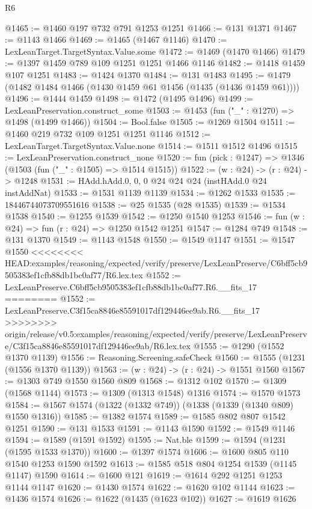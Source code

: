 \begin{lexlean}{R6}
\begin{coremodule}
{{{{{{{{{{{{{{{{{{{{{{{{{{{{{{{{{{{{{{{{{{{{{{{{{{{{{{{{{{{{{@1465 := @1460 @197 @732 @791 @1253 @1251
@1466 := @131 @1371
@1467 := @1143 @1466
@1469 := @1465 (@1467 @1146)
@1470 := LexLeanTarget.TargetSyntax.Value.some
@1472 := @1469 (@1470 @1466)
@1479 := @1397 @1459 @789 @109 @1251 @1251 @1466 @1146
@1482 := @1418 @1459 @107 @1251
@1483 := @1424 @1370
@1484 := @131 @1483
@1495 := @1479 (@1482 @1484 @1466 (@1430 @1459 @61 @1456 (@1435 (@1436 @1459 @61))))
@1496 := @1444 @1459
@1498 := @1472 (@1495 @1496)
@1499 := LexLeanPreservation.construct_some
@1503 := @1453 (fun ("_" : @1270) => @1498 (@1499 @1466))
@1504 := Bool.false
@1505 := @1269 @1504
@1511 := @1460 @219 @732 @109 @1251 @1251 @1146
@1512 := LexLeanTarget.TargetSyntax.Value.none
@1514 := @1511 @1512 @1496
@1515 := LexLeanPreservation.construct_none
@1520 := fun (pick : @1247) => @1346 (@1503 (fun ("_" : @1505) => @1514 @1515))
@1522 := (w : @24) -> (r : @24) -> @1248
@1531 := HAdd.hAdd.{0, 0, 0} @24 @24 @24 (instHAdd.{0} @24 instAddNat)
@1533 := @1531 @1139 @1139
@1534 := @1262 @1533
@1535 := 18446744073709551616
@1538 := @25 @1535 (@28 @1535)
@1539 := @1534 @1538
@1540 := @1255 @1539
@1542 := @1250 @1540 @1253
@1546 := fun (w : @24) => fun (r : @24) => @1250 @1542 @1251
@1547 := @1284 @749
@1548 := @131 @1370
@1549 := @1143 @1548
@1550 := @1549 @1147
@1551 := @1547 @1550
<<<<<<<< HEAD:examples/reasoning/expected/verify/preserve/LexLeanPreserve/C6bff5cb9505383ef1cfb88db1bc0af77/R6.lex.tex
@1552 := LexLeanPreserve.C6bff5cb9505383ef1cfb88db1bc0af77.R6.__fits_17
========
@1552 := LexLeanPreserve.C3f15ca8846e85591017df129446ee9ab.R6.__fits_17
>>>>>>>> origin/release/v0.5:examples/reasoning/expected/verify/preserve/LexLeanPreserve/C3f15ca8846e85591017df129446ee9ab/R6.lex.tex
@1555 := @1290 (@1552 @1370 @1139)
@1556 := Reasoning.Screening.safeCheck
@1560 := @1555 (@1231 (@1556 @1370 @1139))
@1563 := (w : @24) -> (r : @24) -> @1551 @1560
@1567 := @1303 @749 @1550 @1560 @809
@1568 := @1312 @102
@1570 := @1309 (@1568 @1144)
@1573 := @1309 (@1313 @1548) @1316
@1574 := @1570 @1573
@1584 := @1567 @1574 (@1322 (@1332 @749)) (@1338 (@1339 (@1340 @809) @1550 @1316))
@1585 := @1382 @1574
@1589 := @1585 @802 @807 @1542 @1251
@1590 := @131 @1533
@1591 := @1143 @1590
@1592 := @1549 @1146
@1594 := @1589 (@1591 @1592)
@1595 := Nat.ble
@1599 := @1594 (@1231 (@1595 @1533 @1370))
@1600 := @1397 @1574
@1606 := @1600 @805 @110 @1540 @1253 @1590 @1592
@1613 := @1585 @518 @804 @1254 @1539 (@1145 @1147) @1590
@1614 := @1600 @121
@1619 := @1614 @292 @1251 @1253 @1144 @1147
@1620 := @1430 @1574
@1622 := @1620 @102 @1144
@1623 := @1436 @1574
@1626 := @1622 (@1435 (@1623 @102))
@1627 := @1619 @1626
}}}}}}}}}}}}}}}}}}}}}}}}}}}}}}}}}}}}}}}}}}}}}}}}}}}}}}}}}}}}}
\end{coremodule}
\end{lexlean}
